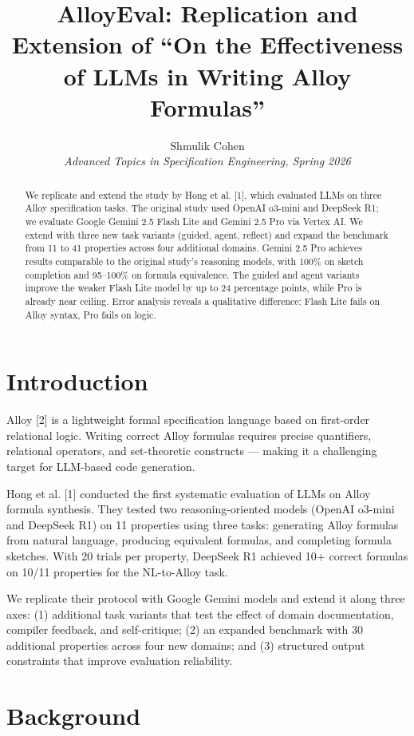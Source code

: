\documentclass[11pt]{article}
\title{AlloyEval: Replication and Extension of ``On the Effectiveness of LLMs in Writing Alloy Formulas''}
\author{Shmulik Cohen\\
\textit{Advanced Topics in Specification Engineering, Spring 2026}}
\date{}
\begin{document}
\maketitle

\begin{abstract}
We replicate and extend the study by Hong et al. [1], which evaluated LLMs on three Alloy specification tasks.
The original study used OpenAI o3-mini and DeepSeek R1; we evaluate Google Gemini 2.5 Flash Lite and Gemini 2.5 Pro via Vertex AI.
We extend with three new task variants (guided, agent, reflect) and expand the benchmark from 11 to 41 properties across four additional domains.
Gemini 2.5 Pro achieves results comparable to the original study's reasoning models, with 100\% on sketch completion and 95--100\% on formula equivalence. The guided and agent variants improve the weaker Flash Lite model by up to 24 percentage points, while Pro is already near ceiling. Error analysis reveals a qualitative difference: Flash Lite fails on Alloy syntax, Pro fails on logic.
\end{abstract}

\section{Introduction}

Alloy [2] is a lightweight formal specification language based on first-order relational logic. Writing correct Alloy formulas requires precise quantifiers, relational operators, and set-theoretic constructs --- making it a challenging target for LLM-based code generation.

Hong et al. [1] conducted the first systematic evaluation of LLMs on Alloy formula synthesis. They tested two reasoning-oriented models (OpenAI o3-mini and DeepSeek R1) on 11 properties using three tasks: generating Alloy formulas from natural language, producing equivalent formulas, and completing formula sketches. With 20 trials per property, DeepSeek R1 achieved 10+ correct formulas on 10/11 properties for the NL-to-Alloy task.

We replicate their protocol with Google Gemini models and extend it along three axes: (1) additional task variants that test the effect of domain documentation, compiler feedback, and self-critique; (2) an expanded benchmark with 30 additional properties across four new domains; and (3) structured output constraints that improve evaluation reliability.

\section{Background}
\end{document}
